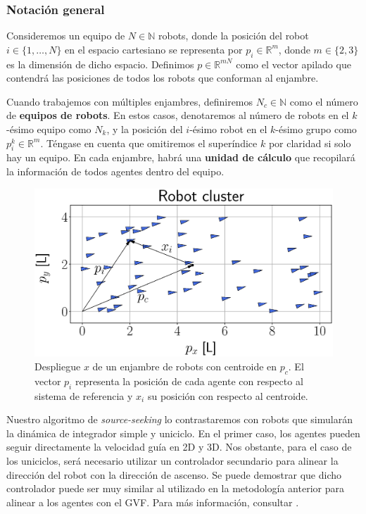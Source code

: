 \subsubsection{Notación general}

Consideremos un equipo de $N \in \mathds{N}$ robots, donde la posición del robot $i \in \{1,\dots,N\}$ en el espacio cartesiano se representa por $p_i \in \mathds{R}^m$, donde $m \in \{2,3\}$ es la dimensión de dicho espacio. Definimos $p\in\mathds{R}^{mN}$ como el vector apilado que contendrá las posiciones de todos los robots que conforman al enjambre. 

Cuando trabajemos con múltiples enjambres, definiremos $N_c \in \mathds{N}$ como el número de \textbf{equipos de robots}. En estos casos, denotaremos al número de robots en el $k$-ésimo equipo como $N_k$, y la posición del $i$-ésimo robot en el $k$-ésimo grupo como $p_i^k \in \mathds{R}^m$. Téngase en cuenta que omitiremos el superíndice $k$ por claridad si solo hay un equipo. En cada enjambre, habrá una \textbf{unidad de cálculo} que recopilará la información de todos agentes dentro del equipo.

\vspace{1cm}

\begin{figure}[!h]
\centering
\includegraphics[trim={0 7cm 0 9.6cm}, clip, width=0.8\columnwidth]{./fig/SS_pcxi.eps}
\caption{Despliegue $x$ de un enjambre de robots con centroide en $p_c$. El vector $p_i$ representa la posición de cada agente con respecto al sistema de referencia y $x_i$ su posición con respecto al centroide.}
\label{fig: deployment}
\end{figure}

Nuestro algoritmo de \textit{source-seeking} lo contrastaremos con robots que simularán la dinámica de integrador simple y uniciclo. En el primer caso, los agentes pueden seguir directamente la velocidad guía en 2D y 3D. Nos obstante, para el caso de los uniciclos, será necesario utilizar un controlador secundario para alinear la dirección del robot con la dirección de ascenso. Se puede demostrar que dicho controlador puede ser muy similar al utilizado en la metodología anterior para alinear a los agentes con el GVF. Para más información, consultar \cite{tfg_antonio}. 

